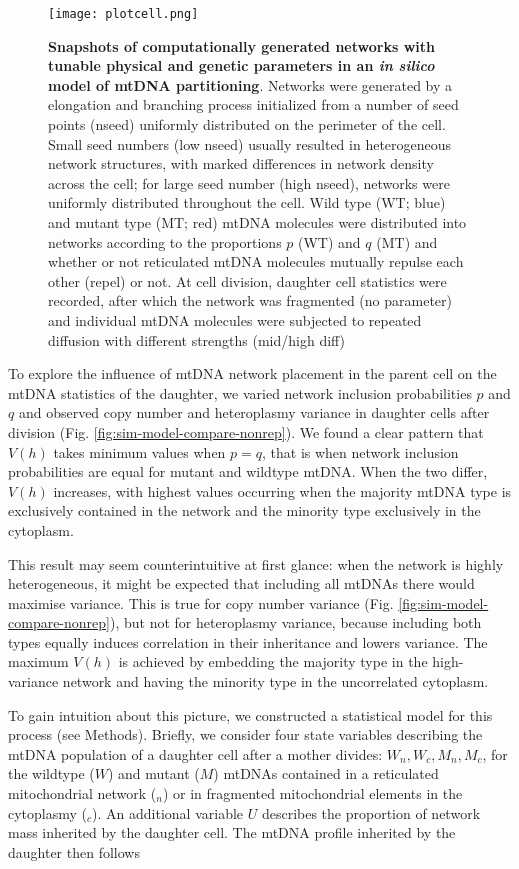\documentclass{article}
\begin{document}
\begin{figure}
\centering
\texttt{[image: plotcell.png]}
\caption{\textbf{Snapshots of computationally generated networks with tunable physical and genetic parameters in an \textit{in silico} model of mtDNA partitioning}. Networks were generated by a elongation and branching process initialized from a number of seed points (nseed) uniformly distributed on the perimeter of the cell. Small seed numbers (low nseed) usually resulted in heterogeneous network structures, with marked differences in network density across the cell; for large seed number (high nseed), networks were uniformly distributed throughout the cell. Wild type (WT; blue) and mutant type (MT; red) mtDNA molecules were distributed into networks according to the proportions $p$ (WT) and $q$ (MT) and whether or not reticulated mtDNA molecules mutually repulse each other (repel) or not. At cell division, daughter cell statistics were recorded, after which the network was fragmented (no parameter) and individual mtDNA molecules were subjected to repeated diffusion with different strengths (mid/high diff)}\label{fig:main_fig1_plotcell}
\end{figure}

To explore the influence of mtDNA network placement in the parent cell on the mtDNA statistics of the daughter, we varied network inclusion probabilities $p$ and $q$ and observed copy number and heteroplasmy variance in daughter cells after division (Fig. \ref{fig:sim-model-compare-nonrep}). We found a clear pattern that $V(h)$ takes minimum values when $p=q$, that is when network inclusion probabilities are equal for mutant and wildtype mtDNA. When the two differ, $V(h)$ increases, with highest values occurring when the majority mtDNA type is exclusively contained in the network and the minority type exclusively in the cytoplasm. 

This result may seem counterintuitive at first glance: when the network is highly heterogeneous, it might be expected that including all mtDNAs there would maximise variance. This is true for copy number variance (Fig. \ref{fig:sim-model-compare-nonrep}), but not for heteroplasmy variance, because including both types equally induces correlation in their inheritance and lowers variance. The maximum $V(h)$ is achieved by embedding the majority type in the high-variance network and having the minority type in the uncorrelated cytoplasm. 

To gain intuition about this picture, we constructed a statistical model for this process (see Methods). Briefly, we consider four state variables describing the mtDNA population of a daughter cell after a mother divides: $W_n, W_c, M_n, M_c$, for the wildtype ($W$) and mutant ($M$) mtDNAs contained in a reticulated mitochondrial network (${}_n$) or in fragmented mitochondrial elements in the cytoplasmy (${}_c$). An additional variable $U$ describes the proportion of network mass inherited by the daughter cell. The mtDNA profile inherited by the daughter then follows
\end{document}
